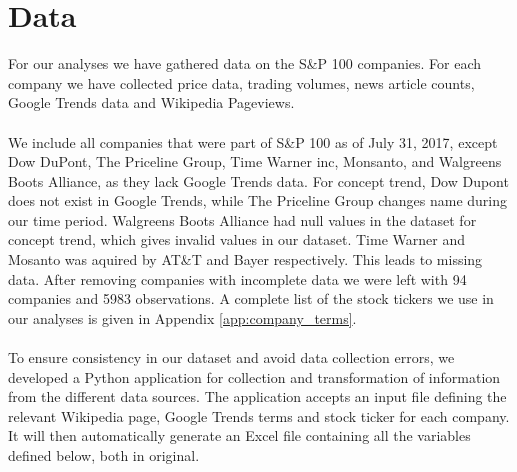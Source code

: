 
\chapter{Data}
For our analyses we have gathered data on the  S\&P 100 companies. For each company we have collected price data, trading volumes, news article counts, Google Trends data and Wikipedia Pageviews.  
\\\\
We include all companies that were part of S\&P 100 as of July 31, 2017, except Dow DuPont, The Priceline Group, Time Warner inc, Monsanto, and Walgreens Boots Alliance, as they lack Google Trends data. For concept trend, Dow Dupont does not exist in Google Trends, while The Priceline Group changes name during our time period. Walgreens Boots Alliance had null values in the dataset for concept trend, which gives invalid values in our dataset. Time Warner and Mosanto was aquired by AT\&T and Bayer respectively. This leads to missing data. After removing companies with incomplete data we were left with 94 companies and 5983 observations. A complete list of the stock tickers we use in our analyses is given in Appendix \ref{app:company_terms}.
\\\\
To ensure consistency in our dataset and avoid data collection errors, we developed a Python application for collection and transformation of information from the different data sources. The application accepts an input file defining the relevant Wikipedia page, Google Trends terms and stock ticker for each company. It will then automatically generate an Excel file containing all the variables defined below, both in original.


